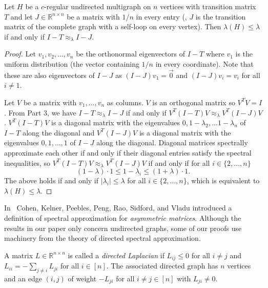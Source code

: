 \documentclass{toc}
\numberwithin{myalgctr}{section}
\theoremstyle{named}
\begin{document}
\begin{lemma}
\label{lem:expanderapprox}
Let $H$ be a $c$-regular undirected multigraph on $n$ vertices with transition matrix $T$ and let $J\in\mathbb{R}^{n\times n}$ be a matrix with $1/n$ in every entry (\ie, $J$ is the transition matrix of the complete graph with a self-loop  %
on every vertex). Then $\lambda(H)\leq \lambda$ if and only if $I-T\approx_{\lambda} I-J$.
\end{lemma}
\begin{proof}
Let $v_1,v_2,\ldots,v_n$ be the orthonormal eigenvectors of $I-T$ where $v_1$ is the uniform distribution (the vector containing $1/n$ in every coordinate). Note that these are also eigenvectors of $I-J$ as $(I-J)v_1=\vec{0}$ and $(I-J)v_i=v_i$ for all $i\neq 1$. 

Let $V$ be a matrix with $v_1,\ldots,v_n$ as columns. $V$ is an orthogonal matrix so $V^TV=I$. {}From  Part 3, we have $I-T\approx_{\lambda}I-J$ if and only if $V^T(I-T)V\approx_{\lambda}V^T(I-J)V$. $V^T(I-T)V$ is a diagonal matrix with the eigenvalues $0,1-\lambda_2,\ldots 1-\lambda_n$ of $I-T$ along the diagonal and $V^T(I-J)V$ is a diagonal matrix with the eigenvalues $0,1,\ldots, 1$ of $I-J$ along the diagonal. Diagonal matrices spectrally approximate each other if and only if their diagonal entries satisfy the spectral inequalities, so $V^T(I-T)V\approx_{\lambda}V^T(I-J)V$ if and only if for all $i\in\{2,\ldots,n\}$
\[
(1-\lambda)\cdot 1\leq 1-\lambda_i\leq (1+\lambda)\cdot 1.
\]
The above holds if and only if $|\lambda_i|\leq \lambda$ for all $i\in\{2,\ldots,n\}$, which is equivalent to $\lambda(H)\leq \lambda$. 
\end{proof}



In~\cite{CKPPRSV16} Cohen, Kelner, Peebles, Peng, Rao, Sidford, and Vladu introduced a definition of spectral approximation for \emph{asymmetric matrices}. Although the results in our paper only concern undirected graphs, some of our proofs use machinery from the theory of directed spectral approximation.  

\begin{definition}
\label{def:dirlap}
A matrix $L\in\mathbb{R}^{n\times n}$ is called a \emph{directed Laplacian} if $L_{ij}\leq 0$ for all $i\neq j$ and $L_{ii}=-\sum_{j\neq i}L_{ji}$ for all $i\in[n]$. The associated directed graph has $n$ vertices and an edge $(i,j)$ of weight $-L_{ji}$ for all $i\neq j\in[n]$ with $L_{ji}\neq 0$.
\end{definition}
\end{document}
